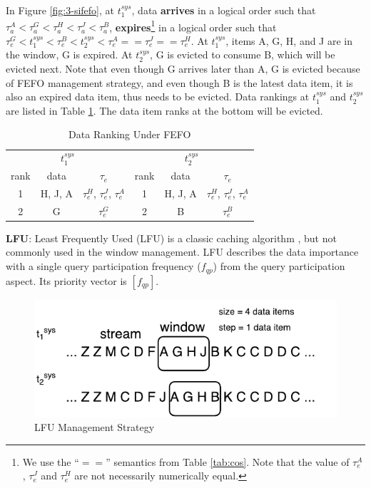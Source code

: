 In Figure \ref{fig:3-sifefo}, at $t^{sys}_{1}$, data \textbf{arrives} in a logical order such that $\tau^{A}_{a} < \tau^{G}_{a} < \tau^{H}_{a} < \tau^{J}_{a} < \tau^{B}_{a}$, \textbf{expires}\footnote{We use the ``$==$'' semantics from Table \ref{tab:cos}. Note that the value of $\tau^{A}_{e}$, $\tau^{J}_{e}$ and $\tau^{H}_{e}$ are not necessarily numerically equal.} in a logical order such that $\tau^{G}_{e} < t^{sys}_{1} < \tau^{B}_{e} < t^{sys}_{2} < \tau^{A}_{e} == \tau^{J}_{e} == \tau^{H}_{e}$.
At $t^{sys}_{1}$, items A, G, H, and J are in the window, G is expired.
At $t^{sys}_{2}$, G is evicted to consume B, which will be evicted next. 
Note that even though G arrives later than A, G is evicted because of FEFO management strategy,
and even though B is the latest data item, it is also an expired data item, thus needs to be evicted. 
Data rankings at $t^{sys}_{1}$ and $t^{sys}_{2}$ are listed in Table \ref{tab:fefo}. 
The data item ranks at the bottom will be evicted. 

\begin{table}[!htbp]
\centering
\caption{Data Ranking Under FEFO}
\label{tab:fefo}
\begin{tabular}{|c|c|c||c|c|c|}
\hline
\multicolumn{3}{|c||}{$t^{sys}_{1}$} & \multicolumn{3}{c|}{$t^{sys}_{2}$} \\ \hhline{|===#===|}
rank & data & $\tau_{e}$ & rank & data & $\tau_{e}$ \\ \hhline{|=|=|=#=|=|=|}
1 & H, J, A & $\tau^{H}_{e}$, $\tau^{J}_{e}$, $\tau^{A}_{e}$ & 1 & H, J, A & $\tau^{H}_{e}$, $\tau^{J}_{e}$, $\tau^{A}_{e}$ \\ \hline
2 & G & $\tau^{G}_{e}$ & 2 & B & $\tau^{B}_{e}$ \\ \hline
\end{tabular}
\end{table}

\textbf{LFU}:
Least Frequently Used (LFU) is a classic caching algorithm \cite{crp2018}, but not commonly used in the window management.
LFU describes the data importance with a single query participation frequency ($f_{qp}$) from the query participation aspect. 
Its priority vector is $[f_{qp}]$.

\begin{figure}[!htbp]
	\centering
    \includegraphics[width=5in]{img/3-silfu.pdf}
    \caption{LFU Management Strategy}
    \label{fig:3-silfu}
\end{figure}

